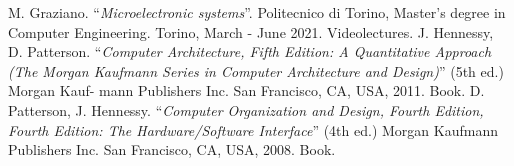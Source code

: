 
\begin{thebibliography}{99}
     M. Graziano. \enquote{\textit{Microelectronic systems}}. Politecnico di Torino, Master’s degree in Computer Engineering. Torino, March - June 2021. Videolectures.
     J. Hennessy, D. Patterson. \enquote{\textit{Computer Architecture, Fifth Edition: A Quantitative Approach (The Morgan Kaufmann Series in Computer Architecture and Design)}} (5th ed.) Morgan Kauf- mann Publishers Inc. San Francisco, CA, USA, 2011. Book.
     D. Patterson, J. Hennessy. \enquote{\textit{Computer Organization and Design, Fourth Edition, Fourth Edition: The Hardware/Software Interface}} (4th ed.) Morgan Kaufmann Publishers Inc. San Francisco, CA, USA, 2008. Book.
\end{thebibliography}
